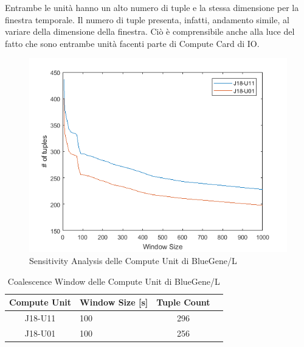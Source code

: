 		Entrambe le unità hanno un alto numero di tuple e la stessa dimensione per la finestra temporale. Il numero di tuple presenta, infatti, andamento simile, al variare della dimensione della finestra. Ciò è comprensibile anche alla luce del fatto che sono entrambe unità facenti parte di Compute Card di IO.
		
		\begin{figure}[H]
			\centering
			\includegraphics[scale=0.7]{./immagine/categorieBGcwin.png}
			\caption{Sensitivity Analysis delle Compute Unit di BlueGene/L}
			\label{fig:ffda-cBGcwin}
		\end{figure}
	
		\begin{table}
			\footnotesize
			\caption{Coalescence Window delle Compute Unit di BlueGene/L}
			\label{tab:ffda-cBGcwin}
			\centering
			\begin{tabular}{clcc}
				\toprule
				\textbf{Compute Unit} &
				\textbf{Window Size [s]} &
				\textbf{Tuple Count}\\
				\midrule
				J18-U11 &
				100 &
				296\\
				\midrule
				J18-U01 &
				100 &
				256\\
				\bottomrule			
			\end{tabular}
		\end{table}
	
